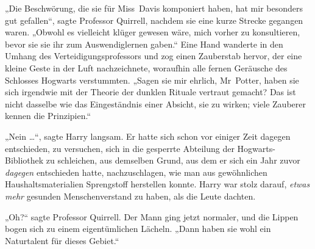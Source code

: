 „Die Beschwörung, die sie für Miss~Davis komponiert haben, hat mir besonders gut gefallen“, sagte Professor Quirrell, nachdem sie eine kurze Strecke gegangen waren.
„Obwohl es vielleicht klüger gewesen wäre, mich vorher zu konsultieren, bevor sie sie ihr zum Auswendiglernen gaben.“ Eine Hand wanderte in den Umhang des Verteidigungsprofessors und zog einen Zauberstab hervor, der eine kleine Geste in der Luft nachzeichnete, woraufhin alle fernen Geräusche des Schlosses Hogwarts verstummten.
„Sagen sie mir ehrlich, Mr~Potter, haben sie sich irgendwie mit der Theorie der dunklen Rituale vertraut gemacht? Das ist nicht dasselbe wie das Eingeständnis einer Absicht, sie zu wirken; viele Zauberer kennen die Prinzipien.“

„Nein …“, sagte Harry langsam. Er hatte sich schon vor einiger Zeit dagegen entschieden, zu versuchen, sich in die gesperrte Abteilung der Hogwarts-Bibliothek zu schleichen, aus demselben Grund, aus dem er sich ein Jahr zuvor \emph{dagegen} entschieden hatte, nachzuschlagen, wie man aus gewöhnlichen Haushaltsmaterialien Sprengstoff herstellen konnte. Harry war stolz darauf, \emph{etwas} \emph{mehr} gesunden Menschenverstand zu haben, als die Leute dachten.

„Oh?“ sagte Professor Quirrell. Der Mann ging jetzt normaler, und die Lippen bogen sich zu einem eigentümlichen Lächeln.
„Dann haben sie wohl ein Naturtalent für dieses Gebiet.“


